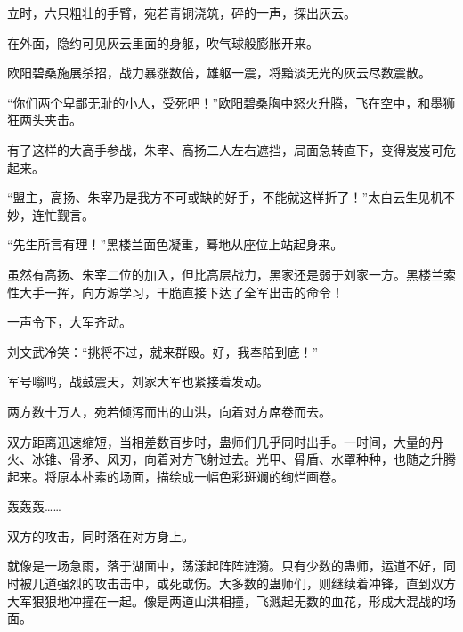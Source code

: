 \begin{this_body}
立时，六只粗壮的手臂，宛若青铜浇筑，砰的一声，探出灰云。

在外面，隐约可见灰云里面的身躯，吹气球般膨胀开来。

欧阳碧桑施展杀招，战力暴涨数倍，雄躯一震，将黯淡无光的灰云尽数震散。

“你们两个卑鄙无耻的小人，受死吧！”欧阳碧桑胸中怒火升腾，飞在空中，和墨狮狂两头夹击。

有了这样的大高手参战，朱宰、高扬二人左右遮挡，局面急转直下，变得岌岌可危起来。

“盟主，高扬、朱宰乃是我方不可或缺的好手，不能就这样折了！”太白云生见机不妙，连忙觐言。

“先生所言有理！”黑楼兰面色凝重，蓦地从座位上站起身来。

虽然有高扬、朱宰二位的加入，但比高层战力，黑家还是弱于刘家一方。黑楼兰索性大手一挥，向方源学习，干脆直接下达了全军出击的命令！

一声令下，大军齐动。

刘文武冷笑：“挑将不过，就来群殴。好，我奉陪到底！”

军号嗡鸣，战鼓震天，刘家大军也紧接着发动。

两方数十万人，宛若倾泻而出的山洪，向着对方席卷而去。

双方距离迅速缩短，当相差数百步时，蛊师们几乎同时出手。一时间，大量的丹火、冰锥、骨矛、风刃，向着对方飞射过去。光甲、骨盾、水罩种种，也随之升腾起来。将原本朴素的场面，描绘成一幅色彩斑斓的绚烂画卷。

轰轰轰……

双方的攻击，同时落在对方身上。

就像是一场急雨，落于湖面中，荡漾起阵阵涟漪。只有少数的蛊师，运道不好，同时被几道强烈的攻击击中，或死或伤。大多数的蛊师们，则继续着冲锋，直到双方大军狠狠地冲撞在一起。像是两道山洪相撞，飞溅起无数的血花，形成大混战的场面。

\end{this_body}

